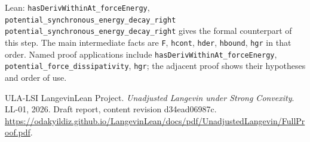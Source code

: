 \documentclass[11pt,a4paper]{article}
\begin{document}
\begin{leanbox}{Lean: \texttt{hasDerivWithinAt\_\allowbreak{}forceEnergy}, \texttt{potential\_\allowbreak{}synchronous\_\allowbreak{}energy\_\allowbreak{}decay\_\allowbreak{}right}}
\texttt{potential\_\allowbreak{}synchronous\_\allowbreak{}energy\_\allowbreak{}decay\_\allowbreak{}right} gives the formal counterpart of this step. The main intermediate facts are \texttt{F}, \texttt{hcont}, \texttt{hder}, \texttt{hbound}, \texttt{hgr} in that order. Named proof applications include \texttt{has\allowbreak{}Deriv\allowbreak{}Within\allowbreak{}At\_\allowbreak{}force\allowbreak{}Energy}, \texttt{potential\_\allowbreak{}force\_\allowbreak{}dissipativity}, \texttt{hgr}; the adjacent proof shows their hypotheses and order of use.
\end{leanbox}

\begin{thebibliography}{ULA-LSI}
LangevinLean Project. \emph{Unadjusted Langevin under Strong Convexity}. LL-01, 2026. Draft report, content revision d34ead06987c. \url{https://odakyildiz.github.io/LangevinLean/docs/pdf/UnadjustedLangevin/FullProof.pdf}.
\end{thebibliography}
\end{document}
